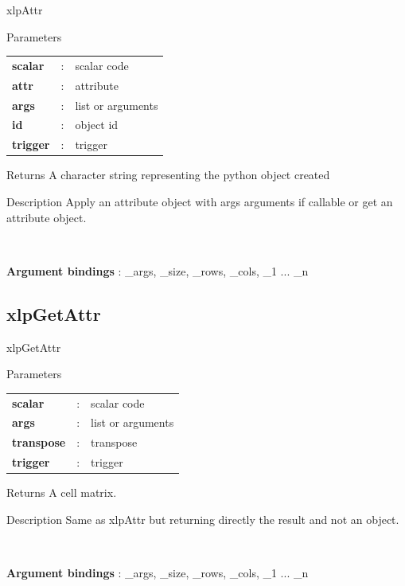 \begin{xlpfunctitle}{xlpAttr}

\begin{xlpfunc}{Parameters}
\begin{tabular}{p{3.5cm}cl}
\textbf{scalar}& : & scalar code \\
\textbf{attr}& : & attribute \\
\textbf{args}& : & list or arguments \\
\textbf{id}& : & object id   \\
\textbf{trigger}& : & trigger \\
\end{tabular}

\vspace{2mm}

\end{xlpfunc}


\begin{xlpfunc}{Returns}
A character string representing the python object created
\end{xlpfunc}

\begin{xlpfunc}{Description}
Apply an attribute object with args arguments if callable or get an attribute object.

\

\textbf{Argument bindings} : \_args, \_size, \_rows, \_cols, \_1 ... \_n

\end{xlpfunc}
\end{xlpfunctitle}


\subsection{xlpGetAttr}

\begin{xlpfunctitle}{xlpGetAttr}

\begin{xlpfunc}{Parameters}
\begin{tabular}{p{3.5cm}cl}
\textbf{scalar}& : & scalar code \\
\textbf{args}& : & list or arguments \\
\textbf{transpose}& : & transpose \\
\textbf{trigger}& : & trigger \\
\end{tabular}

\vspace{2mm}

\end{xlpfunc}


\begin{xlpfunc}{Returns}
A cell matrix.
\end{xlpfunc}

\begin{xlpfunc}{Description}
Same as xlpAttr but returning directly the result and not an object.

\

\textbf{Argument bindings} : \_args, \_size, \_rows, \_cols, \_1 ... \_n

\end{xlpfunc}
\end{xlpfunctitle}

